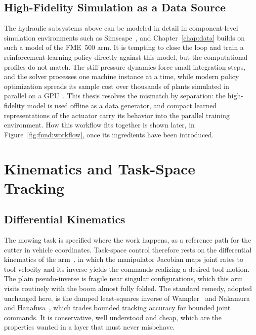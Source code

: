 \subsection{High-Fidelity Simulation as a Data Source}
\label{sec:fund:sim-data-source}

The hydraulic subsystems above can be modeled in detail in
component-level simulation environments such as
Simscape~\cite{mathworks2024simscape}, and Chapter~\ref{chap:data} builds
on such a model of the FME~500 arm. It is tempting to close the loop and
train a reinforcement-learning policy directly against this model, but
the computational profiles do not match. The stiff pressure dynamics
force small integration steps, and the solver processes one machine
instance at a time, while modern policy optimization spreads its sample
cost over thousands of plants simulated in parallel on a
GPU~\cite{makoviychuk2021isaac}. This thesis resolves
the mismatch by separation: the high-fidelity model is used offline as a
data generator, and compact learned representations of the actuator
carry its behavior into the parallel training environment. How this
workflow fits together is shown later, in
Figure~\ref{fig:fund:workflow}, once its ingredients have been
introduced.

\section{Kinematics and Task-Space Tracking}
\label{sec:fund:kinematics}

\subsection{Differential Kinematics}

The mowing task is specified where the work happens, as a reference path
for the cutter in vehicle coordinates. Task-space control therefore rests
on the differential kinematics of the arm~\cite{siciliano2009robotics},
in which the manipulator Jacobian maps joint rates to tool velocity and
its inverse yields the commands realizing a desired tool motion. The
plain pseudo-inverse is fragile near singular configurations, which this
arm visits routinely with the boom almost fully folded. The standard
remedy, adopted unchanged here, is the damped least-squares inverse of
Wampler~\cite{wampler1986manipulator} and Nakamura and
Hanafusa~\cite{nakamura1986inverse}, which trades bounded tracking
accuracy for bounded joint commands. It is conservative, well understood
and cheap, which are the properties wanted in a layer that must never
misbehave.

